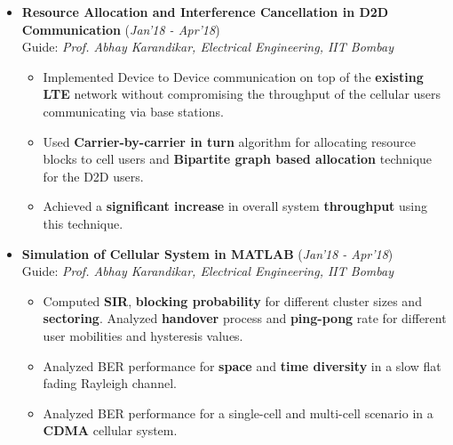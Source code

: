\documentclass[10pt]{article}
\begin{document}
\colorbox{bl}{}
\vspace{-0.5cm}
\begin{itemize}[leftmargin=0.4cm]

\item \textbf{Resource Allocation and Interference Cancellation in D2D Communication}
\hfill{(\textit{Jan'18 - Apr'18})}\\
Guide: \textit{Prof. Abhay Karandikar, Electrical Engineering, IIT Bombay}\\
\vspace{-0.7cm}
	\begin{itemize}
	\item Implemented Device to Device communication on top of the \textbf{existing LTE} network without compromising the throughput of the cellular users communicating via base stations.\vspace{-0.1cm}
	\item Used \textbf{Carrier-by-carrier in turn} algorithm for allocating resource blocks to cell users and \textbf{Bipartite graph based allocation} technique for the D2D users.\vspace{-0.1cm}
	\item Achieved a \textbf{significant increase} in overall system \textbf{throughput} using this technique.
    \end{itemize}

	\vspace{-0.25cm}
	
	
\item \textbf{Simulation of Cellular System in MATLAB}
\hfill{(\textit{Jan'18 - Apr'18})}\\
Guide: \textit{Prof. Abhay Karandikar, Electrical Engineering, IIT Bombay}\\\vspace{-0.7cm}
	\begin{itemize}
	\item Computed \textbf{SIR}, \textbf{blocking probability} for different cluster sizes and \textbf{sectoring}. Analyzed \textbf{handover} process and \textbf{ping-pong} rate for different user mobilities and hysteresis values.\vspace{-0.1cm}
	\item Analyzed BER performance for \textbf{space} and \textbf{time diversity} in a slow flat fading Rayleigh channel.\vspace{-0.1cm}
	\item Analyzed BER performance for a single-cell and multi-cell scenario in a \textbf{CDMA} cellular system.
    \end{itemize}


\end{itemize}
\end{document}
